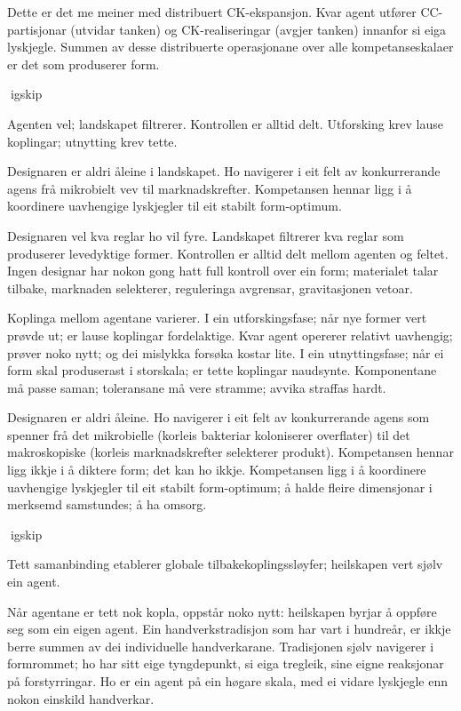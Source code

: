 Dette er det me meiner med distribuert CK-ekspansjon. Kvar agent utfører CC-partisjonar (utvidar tanken) og CK-realiseringar (avgjer tanken) innanfor si eiga lyskjegle. Summen av desse distribuerte operasjonane over alle kompetanseskalaer er det som produserer form.

igskip

Agenten vel; landskapet filtrerer. Kontrollen er alltid delt. Utforsking krev lause koplingar; utnytting krev tette.

Designaren er aldri åleine i landskapet. Ho navigerer i eit felt av konkurrerande agens frå mikrobielt vev til marknadskrefter. Kompetansen hennar ligg i å koordinere uavhengige lyskjegler til eit stabilt form-optimum.

Designaren vel kva reglar ho vil fyre. Landskapet filtrerer kva reglar som produserer levedyktige former. Kontrollen er alltid delt mellom agenten og feltet. Ingen designar har nokon gong hatt full kontroll over ein form; materialet talar tilbake, marknaden selekterer, reguleringa avgrensar, gravitasjonen vetoar.

Koplinga mellom agentane varierer. I ein utforskingsfase; når nye former vert prøvde ut; er lause koplingar fordelaktige. Kvar agent opererer relativt uavhengig; prøver noko nytt; og dei mislykka forsøka kostar lite. I ein utnyttingsfase; når ei form skal produserast i storskala; er tette koplingar naudsynte. Komponentane må passe saman; toleransane må vere stramme; avvika straffas hardt.

Designaren er aldri åleine. Ho navigerer i eit felt av konkurrerande agens som spenner frå det mikrobielle (korleis bakteriar koloniserer overflater) til det makroskopiske (korleis marknadskrefter selekterer produkt). Kompetansen hennar ligg ikkje i å diktere form; det kan ho ikkje. Kompetansen ligg i å koordinere uavhengige lyskjegler til eit stabilt form-optimum; å halde fleire dimensjonar i merksemd samstundes; å ha omsorg.

igskip

Tett samanbinding etablerer globale tilbakekoplingssløyfer; heilskapen vert sjølv ein agent.

Når agentane er tett nok kopla, oppstår noko nytt: heilskapen byrjar å oppføre seg som ein eigen agent. Ein handverkstradisjon som har vart i hundreår, er ikkje berre summen av dei individuelle handverkarane. Tradisjonen sjølv navigerer i formrommet; ho har sitt eige tyngdepunkt, si eiga tregleik, sine eigne reaksjonar på forstyrringar. Ho er ein agent på ein høgare skala, med ei vidare lyskjegle enn nokon einskild handverkar.

